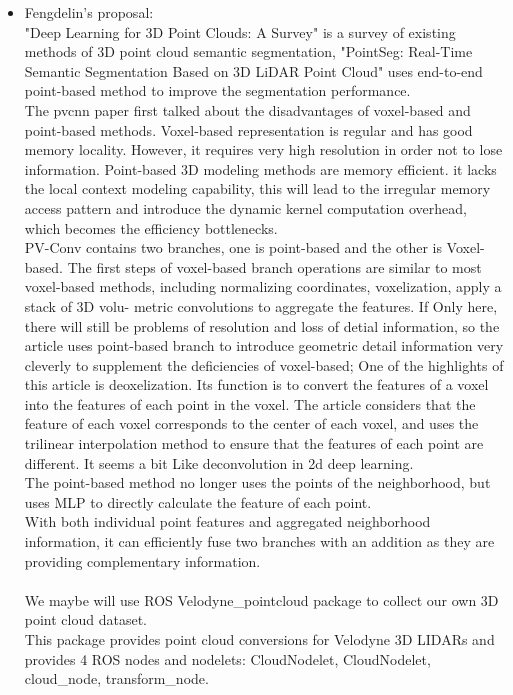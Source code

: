 \documentclass{article}
\begin{document}
\begin{normalsize}
\begin{itemize}
\item Fengdelin's proposal:
\\
"Deep Learning for 3D Point Clouds: A Survey"\cite{9127813} is a survey of existing methods of 3D point cloud semantic segmentation, "PointSeg: Real-Time Semantic Segmentation Based on 3D LiDAR Point Cloud" uses end-to-end point-based method to improve the segmentation performance.\cite{2018PointSeg}
\\
The pvcnn paper\cite{pvcnn} first talked about the disadvantages of voxel-based and point-based methods. Voxel-based representation is regular and has good memory locality. However, it requires very high resolution in order not to lose information. Point-based 3D modeling methods are memory efficient. it lacks the local context modeling capability, this will lead to the irregular memory access pattern and introduce the dynamic kernel computation overhead, which becomes the efficiency bottlenecks.\\
PV-Conv contains two branches, one is point-based and the other is Voxel-based.
The first steps of voxel-based branch operations are similar to most voxel-based methods, including normalizing coordinates, voxelization, apply a stack of 3D volu- metric convolutions to aggregate the features. If Only here, there will still be problems of resolution and loss of detial information, so the article uses point-based branch to introduce geometric detail information very cleverly to supplement the deficiencies of voxel-based;
One of the highlights of this article is deoxelization. Its function is to convert the features of a voxel into the features of each point in the voxel. The article considers that the feature of each voxel corresponds to the center of each voxel, and uses the trilinear interpolation method to ensure that the features of each point are different. It seems a bit Like deconvolution in 2d deep learning.\\
The point-based method no longer uses the points of the neighborhood, but uses MLP to directly calculate the feature of each point.\\
With both individual point features and aggregated neighborhood information, it can efficiently fuse two branches with an addition as they are providing complementary information.\\
\\
We maybe will use ROS Velodyne\_pointcloud package to collect our own 3D point cloud dataset.\\
This package provides point cloud conversions for Velodyne 3D LIDARs and provides 4 ROS nodes and nodelets: CloudNodelet, CloudNodelet, cloud\_node, transform\_node. \\

\end{itemize}
\end{normalsize}
\end{document}
